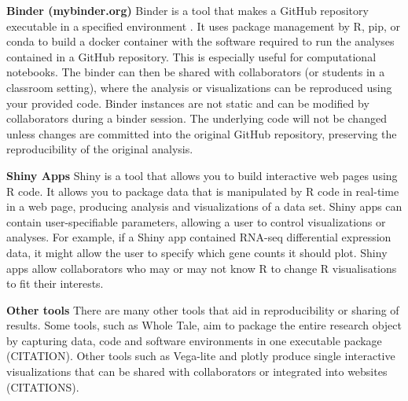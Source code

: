 \documentclass[10pt,letterpaper]{article}
\begin{document}



\begin{greybox}{
 \textbf{Binder (mybinder.org)} Binder is a tool that makes a GitHub repository executable in a specified environment \cite{Jupyter2018}. 
It uses package management by R, pip, or conda to build a docker container with the software required to run the analyses contained in a GitHub repository. 
This is especially useful for computational notebooks. 
The binder can then be shared with collaborators (or students in a classroom setting), where the analysis or visualizations can be reproduced using your provided code. 
Binder instances are not static and can be modified by collaborators during a binder session. 
The underlying code will not be changed unless changes are committed into the original GitHub repository, preserving the reproducibility of the original analysis.
 
 \textbf{Shiny Apps} Shiny is a tool that allows you to build interactive web pages using R code. 
It allows you to package data that is manipulated  by R code in real-time in a web page, producing analysis and visualizations of a data set. 
Shiny apps can contain user-specifiable parameters, allowing a user to control visualizations or analyses. 
For example, if a Shiny app contained RNA-seq differential expression data, it might allow the user to specify which gene counts it should plot. 
Shiny apps allow collaborators who may or may not know R to change R visualisations to fit their interests.   
 
 \textbf{Other tools} There are many other tools that aid in reproducibility or sharing of results. 
Some tools, such as Whole Tale, aim to package the entire research object by capturing data, code and software environments in one executable package (CITATION). 
Other tools such as Vega-lite and plotly produce single interactive visualizations that can be shared with collaborators or integrated into websites (CITATIONS).
}
\end{greybox}
\end{document}
